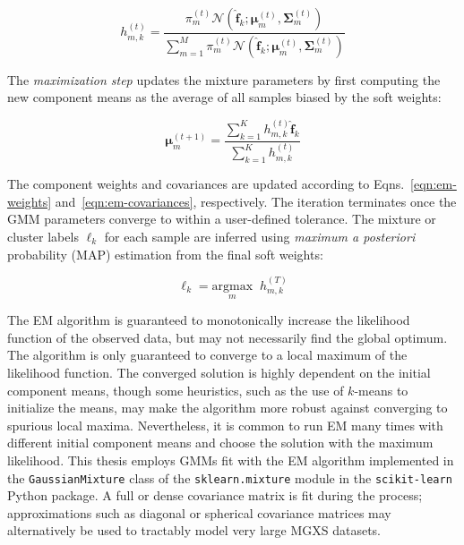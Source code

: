 \begin{equation}
\label{eqn:em-posterior-probs}
h_{m,k}^{(t)} = \frac{\pi_{m}^{(t)} \mathcal{N}\left( \boldsymbol{\hat{f}}_{k}; \boldsymbol{\mu}_{m}^{(t)}, \boldsymbol{\Sigma}_{m}^{(t)} \right)}{\displaystyle\sum\limits_{m=1}^{M}\pi_{m}^{(t)} \mathcal{N}\left( \boldsymbol{\hat{f}}_{k}; \boldsymbol{\mu}_{m}^{(t)}, \boldsymbol{\Sigma}_{m}^{(t)} \right)}
\end{equation}

\noindent The \textit{maximization step} updates the mixture parameters by first computing the new component means as the average of all samples biased by the soft weights:

\begin{equation}
\label{eqn:em-means}
\boldsymbol{\mu}_{m}^{(t+1)} = \frac{\displaystyle\sum\limits_{k=1}^{K}h_{m,k}^{(t)}\boldsymbol{\hat{f}}_{k}}{\displaystyle\sum\limits_{k=1}^{K}h_{m,k}^{(t)}}
\end{equation}

\noindent The component weights and covariances are updated according to Eqns.~\ref{eqn:em-weights} and~\ref{eqn:em-covariances}, respectively. The iteration terminates once the \ac{GMM} parameters converge to within a user-defined tolerance. The mixture or cluster labels $\ell_{k}$ for each sample are inferred using \textit{maximum a posteriori} probability (MAP) estimation from the final soft weights:

\begin{equation}
\label{eqn:chap10-gmm-map}
\ell_{k} = \underset{m}{\text{argmax}} \;\; h_{m,k}^{(T)}
\end{equation}

The EM algorithm is guaranteed to monotonically increase the likelihood function of the observed data, but may not necessarily find the global optimum. The algorithm is only guaranteed to converge to a local maximum of the likelihood function. The converged solution is highly dependent on the initial component means, though some heuristics, such as the use of $k$-means to initialize the means, may make the algorithm more robust against converging to spurious local maxima. Nevertheless, it is common to run EM many times with different initial component means and choose the solution with the maximum likelihood. This thesis employs \acp{GMM} fit with the EM algorithm implemented in the \texttt{GaussianMixture} class of the \texttt{sklearn.mixture} module in the \texttt{scikit-learn} Python package. A full or dense covariance matrix is fit during the process; approximations such as diagonal or spherical covariance matrices may alternatively be used to tractably model very large \ac{MGXS} datasets.

